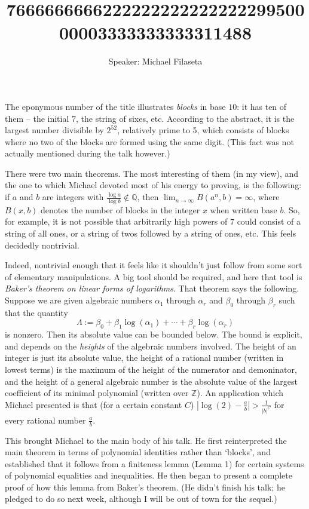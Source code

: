 \documentclass[11pt, leqno]{article}
\title{766666666622222222222222229950000003333333333311488}
\author{Speaker: Michael Filaseta}
\newcommand{\Z}{\mathbb{Z}}
\newcommand{\Q}{\mathbb{Q}}
\begin{document}
\maketitle
The eponymous number of the title illustrates {\it blocks} in base $10$: it has ten of them -- the initial $7$, the string of sixes, etc.
According to the abstract, it is the largest number divisible by $2^{52}$, relatively prime to 5, which consists of blocks where no two of the blocks are formed using the same digit.
(This fact was not actually mentioned during the talk however.)

There were two main theorems. The most interesting of them (in my view), and the one to which Michael devoted most of his energy to proving, is the following:
if $a$ and $b$ are integers with $\frac{ \log a}{ \log b} \not \in \Q$, then $\lim_{n \rightarrow \infty} B(a^n, b) = \infty$, where $B(x, b)$ denotes the number of blocks
in the integer $x$ when written base $b$. So, for example, it is not possible that arbitrarily high powers of $7$ could consist of a string of all ones, or a string of twos followed by
a string of ones, etc. This feels decidedly nontrivial.

Indeed, nontrivial enough that it feels like it shouldn't just follow from some sort of elementary manipulations. A big tool should be required, and here that tool is {\it Baker's theorem
on linear forms of logarithms}. That theorem says the following. Suppose we are given algebraic numbers $\alpha_1$ through $\alpha_r$ and $\beta_0$ through $\beta_r$ such that
the quantity
\[
\Lambda := \beta_0 + \beta_1 \log(\alpha_1) + \cdots + \beta_r \log(\alpha_r)
\]
is nonzero. Then its absolute value can be bounded below. The bound is explicit, and depends on the {\itshape heights} of the algebraic numbers involved. The height of an integer
is just its absolute value, the height of a rational number (written in lowest terms) is the maximum of the height of the numerator and demoninator, and the height of a general
algebraic number is the absolute value of the largest coefficient of its minimal polynomial (written over $\Z$). An application which Michael presented is that (for a certain constant $C$)
$|\log(2) - \frac{a}{b}| > \frac{1}{|b|^C}$ for every rational number $\frac{a}{b}$.

This brought Michael to the main body of his talk. He first reinterpreted the main theorem in terms of polynomial identities rather than `blocks', and established that
it follows from a finiteness lemma (Lemma 1) for certain systems of polynomial equalities and inequalities. He then began to present a complete proof of how this lemma from Baker's theorem. (He didn't finish his talk; he pledged to do so next week, although I will be out of town for the sequel.)
\end{document}
